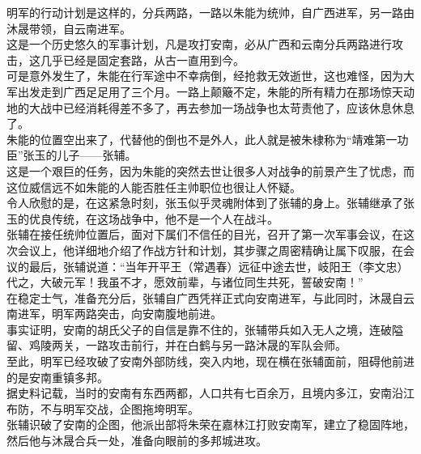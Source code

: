 \begin{multicols}{\theparacolNo}
明军的行动计划是这样的，分兵两路，一路以朱能为统帅，自广西进军，另一路由沐晟带领，自云南进军。\\

这是一个历史悠久的军事计划，凡是攻打安南，必从广西和云南分兵两路进行攻击，这几乎已经是固定套路，从古一直用到今。\\

可是意外发生了，朱能在行军途中不幸病倒，经抢救无效逝世，这也难怪，因为大军出发走到广西足足用了三个月。一路上颠簸不定，朱能的所有精力在那场惊天动地的大战中已经消耗得差不多了，再去参加一场战争也太苛责他了，应该休息休息了。\\

朱能的位置空出来了，代替他的倒也不是外人，此人就是被朱棣称为“靖难第一功臣”张玉的儿子——张辅。\\

这是一个艰巨的任务，因为朱能的突然去世让很多人对战争的前景产生了忧虑，而这位威信远不如朱能的人能否胜任主帅职位也很让人怀疑。\\

令人欣慰的是，在这紧急时刻，张玉似乎灵魂附体到了张辅的身上。张辅继承了张玉的优良传统，在这场战争中，他不是一个人在战斗。\\

张辅在接任统帅位置后，面对下属们不信任的目光，召开了第一次军事会议，在这次会议上，他详细地介绍了作战方针和计划，其步骤之周密精确让属下叹服，在会议的最后，张辅说道：“当年开平王（常遇春）远征中途去世，岐阳王（李文忠）代之，大破元军！我虽不才，愿效前辈，与诸位同生共死，誓破安南！”\\

在稳定士气，准备充分后，张辅自广西凭祥正式向安南进军，与此同时，沐晟自云南进军，明军两路突击，向安南腹地前进。\\

事实证明，安南的胡氏父子的自信是靠不住的，张辅带兵如入无人之境，连破隘留、鸡陵两关，一路攻击前行，并在白鹤与另一路沐晟的军队会师。\\

至此，明军已经攻破了安南外部防线，突入内地，现在横在张辅面前，阻碍他前进的是安南重镇多邦。\\

据史料记载，当时的安南有东西两都，人口共有七百余万，且境内多江，安南沿江布防，不与明军交战，企图拖垮明军。\\

张辅识破了安南的企图，他派出部将朱荣在嘉林江打败安南军，建立了稳固阵地，然后他与沐晟合兵一处，准备向眼前的多邦城进攻。\\


\end{multicols}

